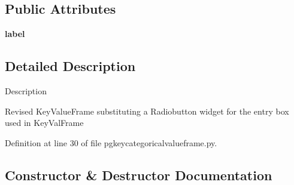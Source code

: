 \subsection*{Public Attributes}
\begin{DoxyCompactItemize}
\item 
{\bfseries label}\hypertarget{classnegui_1_1pgkeycategoricalvalueframe_1_1KeyCategoricalValueFrame_a705820b0a648b0df569e23677d2e0e10}{}\label{classnegui_1_1pgkeycategoricalvalueframe_1_1KeyCategoricalValueFrame_a705820b0a648b0df569e23677d2e0e10}

\end{DoxyCompactItemize}


\subsection{Detailed Description}
\begin{DoxyVerb}Description

Revised KeyValueFrame
substituting a Radiobutton widget
for the entry box used in KeyValFrame\end{DoxyVerb}
 

Definition at line 30 of file pgkeycategoricalvalueframe.\+py.



\subsection{Constructor \& Destructor Documentation}
